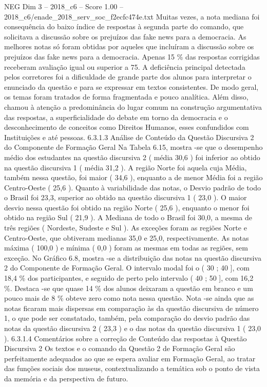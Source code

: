 \begin{textsample}{NEG Dim 3 – 2018\_c6 – Score 1.00 – 2018\_c6/enade\_2018\_serv\_soc\_f2ecfc474e.txt}
Muitas vezes, a nota mediana foi consequência do baixo índice de respostas à segunda parte do comando, que solicitava a discussão sobre os prejuízos das fake news para a democracia.
As melhores notas só foram obtidas por aqueles que incluíram a discussão sobre os prejuízos das fake news para a democracia.
Apenas 15 \% das respostas corrigidas receberam avaliação igual ou superior a 75.
A deficiência principal detectada pelos corretores foi a dificuldade de grande parte dos alunos para interpretar o enunciado da questão e para se expressar em textos consistentes.
De modo geral, os temas foram tratados de forma fragmentada e pouco analítica.
Além disso, chamou à atenção a predominância do lugar comum na construção argumentativa das respostas, a superficialidade do debate em torno da democracia e o desconhecimento de conceitos como Direitos Humanos, esses confundidos com Instituições e até pessoas. 6.3.1.3 Análise de Conteúdo da Questão Discursiva 2 do Componente de Formação Geral Na Tabela 6.15, mostra -se que o desempenho médio dos estudantes na questão discursiva 2 ( média 30,6 ) foi inferior ao obtido na questão discursiva 1 ( média 31,2 ).
A região Norte foi aquela cuja Média, também nessa questão, foi maior ( 34,6 ), enquanto a de menor Média foi a região Centro-Oeste ( 25,6 ).
Quanto à variabilidade das notas, o Desvio padrão de todo o Brasil foi 23,3, superior ao obtido na questão discursiva 1 ( 23,0 ).
O maior desvio nessa questão foi obtido na região Norte ( 25,6 ), enquanto o menor foi obtido na região Sul ( 21,9 ).
A Mediana de todo o Brasil foi 30,0, a mesma de três regiões ( Nordeste, Sudeste e Sul ).
As exceções foram as regiões Norte e Centro-Oeste, que obtiveram medianas 35,0 e 25,0, respectivamente.
As notas máxima ( 100,0 ) e mínima ( 0,0 ) foram as mesmas em todas as regiões, sem exceção.
No Gráfico 6.8, mostra -se a distribuição das notas na questão discursiva 2 do Componente de Formação Geral.
O intervalo modal foi o ( 30 ; 40 ], com 18,4 \% dos participantes, e seguido de perto pelo intervalo ( 40 ; 50 ], com 16,2 \%.
Destaca -se que quase 14 \% dos alunos deixaram a questão em branco e um pouco mais de 8 \% obteve zero como nota nessa questão.
Nota -se ainda que as notas ficaram mais dispersas em comparação às da questão discursiva de número 1, o que pode ser constatado, também, pela comparação do desvio padrão das notas da questão discursiva 2 ( 23,3 ) e o das notas da questão discursiva 1 ( 23,0 ). 6.3.1.4 Comentários sobre a correção de Conteúdo das respostas à Questão Discursiva 2 Os textos e o comando da Questão 2 de Formação Geral são perfeitamente adequados ao que se espera avaliar em Formação Geral, ao tratar das funções sociais dos museus, contextualizando a temática sob o ponto de vista da memória e da perspectiva de futuro.

\end{textsample}
